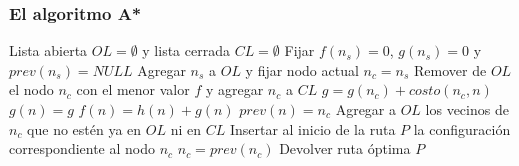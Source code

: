 \begin{frame}\frametitle{El algoritmo A*}
    \begin{algorithm}[H]
    \footnotesize
    \DontPrintSemicolon
    Lista abierta $OL = \emptyset$ y lista cerrada $CL = \emptyset$\;
    Fijar $f(n_{s}) = 0$, $g(n_{s}) = 0$ y $prev(n_{s}) = NULL$\;
    Agregar $n_s$ a $OL$ y fijar nodo actual $n_c = n_s$\;
    {
      Remover de $OL$ el nodo $n_c$ con el menor valor $f$ y agregar $n_c$ a $CL$\;
             {
               $g = g(n_c) + costo(n_c, n)$\;
                  {
                    $g(n) = g$\;
                    $f(n) = h(n) + g(n)$\;
                    $prev(n) = n_c$\;
                  }
             }
      Agregar a $OL$ los vecinos de $n_c$ que no estén ya en $OL$ ni en $CL$\;
    }
          {
            Insertar al inicio de la ruta $P$ la configuración correspondiente al nodo $n_c$\;
            $n_c = prev(n_c)$
          }
    Devolver ruta óptima $P$
  \end{algorithm}
\end{frame}

